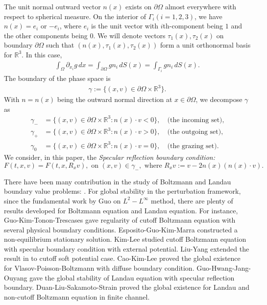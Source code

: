 \documentclass[reqno,a4paper]{amsart}
\numberwithin{equation}{section}
\newcommand{\1}{\mathbf{1}}
\newcommand{\R}{\mathbb{R}}
\newcommand{\<}{\langle}
\renewcommand{\>}{\rangle}
\begin{document}
The unit normal outward vector $n(x)$ exists on $\partial\Omega$ almost everywhere with respect to spherical measure. On the interior of $\Gamma_i$$(i=1,2,3)$, we have $
n(x) = e_i$ or $-e_i$, where $e_i$ is the unit vector with $i$th-component being $1$ and the other components being $0$.  We will denote vectors $\tau_1(x), \tau_2(x)$ on boundary $\partial\Omega$ such that $(n(x),\tau_1(x), \tau_2(x))$ form a unit orthonormal basis for $\R^3$. 
In this case, 
	\begin{align*}
		\int_{\Omega}\partial_{x_i}g\,dx = \int_{\partial\Omega}gn_i\,dS(x) = \int_{\Gamma_i}gn_i\,dS(x). 
	\end{align*}
The boundary of the phase space is 
\begin{align*}
	\gamma:=\{(x,v)\in\partial\Omega\times\R^3\}.
\end{align*}
With $n=n(x)$ being the outward normal direction at $x\in\partial\Omega$, we decompose $\gamma$ as 
\begin{align*}
	\gamma_- &= \{(x,v)\in\partial\Omega\times\R^3 : n(x)\cdot v<0\},\quad\text{(the incoming set),}\\
	\gamma_+ &= \{(x,v)\in\partial\Omega\times\R^3 : n(x)\cdot v>0\},\quad\text{(the outgoing set),}\\
	\gamma_0 &= \{(x,v)\in\partial\Omega\times\R^3 : n(x)\cdot v=0\},\quad\text{(the grazing set).}
\end{align*}
We consider, in this paper, the 
	{\em Specular reflection boundary condition:}
\begin{equation*}
	F(t,x,v) = F(t,x,R_xv), \text{ on } (x,v)\in \gamma_-, \text{ where }R_xv:= v-2n(x)(n(x)\cdot v).
\end{equation*}

There have been many contribution in the study of Boltzmann and Landau boundary value problems: \cite{Cercignani1992,Hamdache1992, Mischler2000,Yang2005, Liu2006,Guo2009, Esposito2013, Guo2016,Kim2017,Cao2019, Guo2020 }. 
For global stability in the perturbation framework, since the fundamental work by Guo \cite{Guo2009} on $L^2-L^\infty$ method, there are plenty of results developed for Boltzmann equation and Landau equation. For instance, Guo-Kim-Tonon-Trescases \cite{Guo2016} gave regularity of cutoff Boltzmann equation with several physical boundary conditions. Esposito-Guo-Kim-Marra \cite{Esposito2013} constructed a non-equilibrium stationary solution. Kim-Lee \cite{Kim2017} studied cutoff Boltzmann equation with specular boundary condition with external potential. Liu-Yang \cite{Liu2016} extended the result in \cite{Guo2009} to cutoff soft potential case. Cao-Kim-Lee \cite{Cao2019} proved the global existence for Vlasov-Poisson-Boltzmann with diffuse boundary condition. Guo-Hwang-Jang-Ouyang \cite{Guo2020} gave the global stability of Landau equation with specular reflection boundary. Duan-Liu-Sakamoto-Strain \cite{Duan2020} proved the global existence for Landau and non-cutoff Boltzmann equation in finite channel. 
\end{document}
